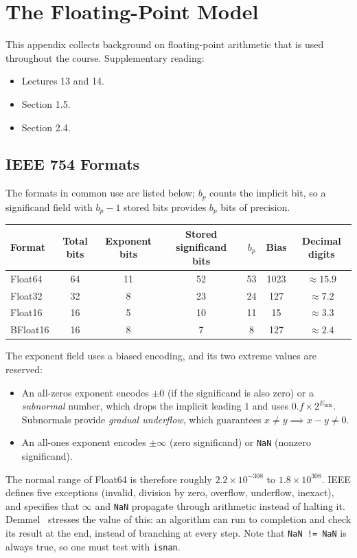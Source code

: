 \chapter{The Floating-Point Model}
\label{app:fp}

This appendix collects background on floating-point arithmetic that is used throughout the course. Supplementary reading:
\begin{itemize}
  \item \cite{TB} Lectures 13 and 14.
  \item \cite{Demmel} Section 1.5.
  \item \cite{GVL} Section 2.4.
\end{itemize}

\section{IEEE 754 Formats}
\label{sec:ieee}

The formats in common use are listed below; $b_p$ counts the implicit bit, so a significand field with $b_p - 1$ stored bits provides $b_p$ bits of precision.
\begin{center}
\begin{tabular}{lcccccc}
  \toprule
  Format & Total bits & Exponent bits & Stored significand bits & $b_p$ & Bias & Decimal digits \\
  \midrule
  Float64 & 64 & 11 & 52 & 53 & 1023 & $\approx 15.9$ \\
  Float32 & 32 & 8 & 23 & 24 & 127 & $\approx 7.2$ \\
  Float16 & 16 & 5 & 10 & 11 & 15 & $\approx 3.3$ \\
  BFloat16 & 16 & 8 & 7 & 8 & 127 & $\approx 2.4$ \\
  \bottomrule
\end{tabular}
\end{center}
The exponent field uses a biased encoding, and its two extreme values are reserved:
\begin{itemize}
  \item An all-zeros exponent encodes $\pm 0$ (if the significand is also zero) or a \emph{subnormal} number, which drops the implicit leading $1$ and uses $0.f \times 2^{E_{\min}}$. Subnormals provide \emph{gradual underflow}, which guarantees $x \ne y \implies x - y \ne 0$.
  \item An all-ones exponent encodes $\pm\infty$ (zero significand) or \texttt{NaN} (nonzero significand).
\end{itemize}
The normal range of Float64 is therefore roughly $2.2 \times 10^{-308}$ to $1.8 \times 10^{308}$. IEEE defines five exceptions (invalid, division by zero, overflow, underflow, inexact), and specifies that $\infty$ and \texttt{NaN} propagate through arithmetic instead of halting it. Demmel~\cite[\S1.5]{Demmel} stresses the value of this: an algorithm can run to completion and check its result at the end, instead of branching at every step. Note that \texttt{NaN != NaN} is always true, so one must test with \texttt{isnan}.


